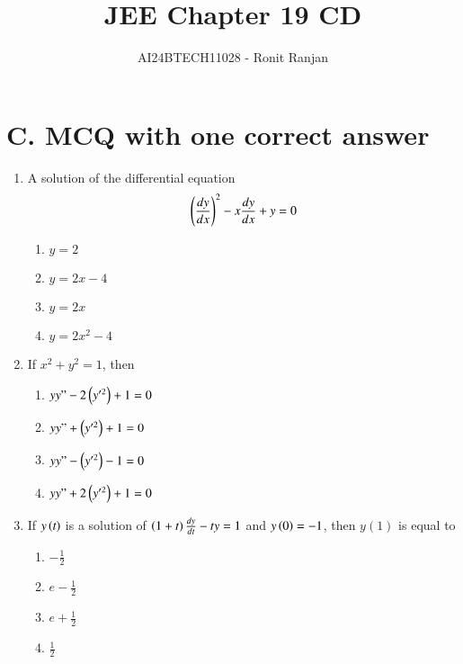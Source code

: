 \documentclass[journal,12pt,twocolumn]{IEEEtran}
\theoremstyle{remark}
\begin{document}

\vspace{3cm}

\title{JEE Chapter 19 CD}
\author{AI24BTECH11028 - Ronit Ranjan}
\maketitle
\newpage
\bigskip
\section*{C. MCQ with one correct answer}
\begin{enumerate}
\item A solution of the differential equation \hfill {}
\begin{align}
\left(\frac{dy}{dx}\right)^2 - x \frac{dy}{dx} + y = 0 
\end{align}
\begin{multicols}{2}
\begin{enumerate}
    \item $y = 2$
    \item $y = 2x -4$
    \item $y = 2x$
    \item $y = 2x^{2}-4$
\end{enumerate}
\end{multicols}

\item If $x^2 + y^2 = 1$, then \hfill {}
\begin{multicols}{2}
\begin{enumerate}
    \item  $yy"-2\left(y'^{2}\right)+1 = 0$
    \item  $yy"+\left(y'^{2}\right)+1 = 0$
    \item  $yy"-\left(y'^{2}\right)-1 = 0$
    \item  $yy"+2\left(y'^{2}\right)+1 = 0$
\end{enumerate}
\end{multicols}

\item If $y\left(t\right)$ is a solution of $\left(1 + t\right) \frac{dy}{dt} - ty = 1$ and $y\left(0\right) = -1$, then $y(1)$ is equal to\hfill {}
\begin{multicols}{2}
\begin{enumerate}
    \item $-\frac{1}{2}$
    \item $e - \frac{1}{2}$
    \item $e + \frac{1}{2}$
    \item $\frac{1}{2}$
\end{enumerate}
\end{multicols}


\end{enumerate}
\end{document}

